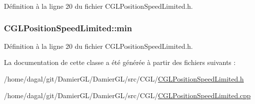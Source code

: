 Définition à la ligne 20 du fichier C\-G\-L\-Position\-Speed\-Limited.\-h.

\hypertarget{class_c_g_l_position_speed_limited_ac4fbd7a13b62092dece478baf938d687}{
\subsubsection[{min}]{ C\-G\-L\-Position\-Speed\-Limited\-::min\hspace{0.3cm}{\ttfamily [protected]}}}\label{class_c_g_l_position_speed_limited_ac4fbd7a13b62092dece478baf938d687}


Définition à la ligne 20 du fichier C\-G\-L\-Position\-Speed\-Limited.\-h.



La documentation de cette classe a été générée à partir des fichiers suivants \-:\begin{DoxyCompactItemize}
\item 
/home/dagal/git/\-Damier\-G\-L/\-Damier\-G\-L/src/\-C\-G\-L/\hyperlink{_c_g_l_position_speed_limited_8h}{C\-G\-L\-Position\-Speed\-Limited.\-h}\item 
/home/dagal/git/\-Damier\-G\-L/\-Damier\-G\-L/src/\-C\-G\-L/\hyperlink{_c_g_l_position_speed_limited_8cpp}{C\-G\-L\-Position\-Speed\-Limited.\-cpp}\end{DoxyCompactItemize}
